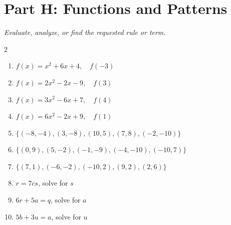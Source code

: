 \documentclass[11pt]{article}
\begin{document}
\section*{Part H: Functions and Patterns}
\noindent\textit{Evaluate, analyze, or find the requested rule or term.}
\begin{multicols}{2}
\begin{enumerate}
  \item $f(x) = x^{2} + 6x + 4, \quad f(-3)$
  \vspace{1.5cm}
  \item $f(x) = 2x^{2} - 2x - 9, \quad f(3)$
  \vspace{1.5cm}
  \item $f(x) = 3x^{2} - 6x + 7, \quad f(4)$
  \vspace{1.5cm}
  \item $f(x) = 6x^{2} - 2x + 9, \quad f(1)$
  \vspace{1.5cm}
  \item $\{(-8, -4), (3, -8), (10, 5), (7, 8), (-2, -10)\}$
  \vspace{1.5cm}
  \item $\{(0, 9), (5, -2), (-1, -9), (-4, -10), (-10, 7)\}$
  \vspace{1.5cm}
  \item $\{(7, 1), (-6, -2), (-10, 2), (9, 2), (2, 6)\}$
  \vspace{1.5cm}
  \item $r = 7cs$, solve for $s$
  \vspace{1.5cm}
  \item $6r + 5a = q$, solve for $a$
  \vspace{1.5cm}
  \item $5b + 3u = a$, solve for $u$
  \vspace{1.5cm}
\end{enumerate}
\end{multicols}
\end{document}
